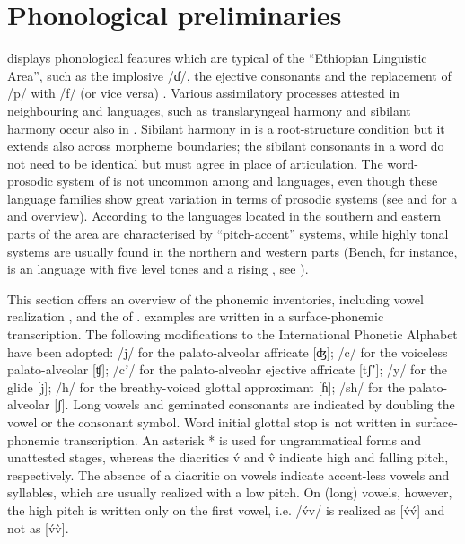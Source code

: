 \documentclass[output=paper,modfonts,nonflat,hidelinks]{langsci/langscibook}
\begin{document}
\section{Phonological preliminaries} \label{sec:Petrollino:2}

 displays phonological features which are typical of the “Ethiopian Linguistic Area”, such as the implosive /ɗ/, the ejective consonants and the replacement of /p/ with /f/ (or vice versa) \citep{Ferguson1970,Ferguson1976,CrassMeyer2008}. Various assimilatory processes attested in neighbouring  and  languages, such as translaryngeal harmony and sibilant harmony \citep{Hayward1988} occur also in . Sibilant harmony in  is a root-structure condition but it extends also across morpheme boundaries; the sibilant consonants in a word do not need to be identical but must agree in place of articulation. The word-prosodic system of  is not uncommon among  and  languages, even though these language families show great variation in terms of prosodic systems (see \citealt{Mous2012} and \citealt{Azeb2012} for a  and  overview). According to \citet[438]{Azeb2012} the languages located in the southern and eastern parts of the  area are characterised by “pitch-accent” systems, while highly tonal systems are usually found in the northern and western parts (Bench, for instance, is an  language with five level tones and a rising , see \citealt{Rapold2006}).

This section offers an overview of the phonemic inventories, including vowel realization , and the   of .  examples are written in a surface-phonemic transcription. The following modifications to the International Phonetic Alphabet have been adopted: /j/ for the palato-alveolar affricate [ʤ]; /c/ for the voiceless palato-alveolar [ʧ]; /cʼ/ for the palato-alveolar ejective affricate [tʃʼ]; /y/ for the glide [j]; /h/ for the breathy-voiced glottal approximant [ɦ]; /sh/ for the palato-alveolar [ʃ]. Long vowels and geminated consonants are indicated by doubling the vowel or the consonant symbol. Word initial glottal stop is not written in surface-phonemic transcription. An asterisk * is used for ungrammatical forms and unattested stages, whereas the diacritics v́ and v̂ indicate high and falling pitch, respectively. The absence of a diacritic on vowels indicate accent-less vowels and syllables, which are usually realized with a low pitch. On  (long) vowels, however, the high pitch is written only on the first vowel, i.e. /v́v/ is realized as [v́v́] and not as [v́v̀].   
\end{document}
